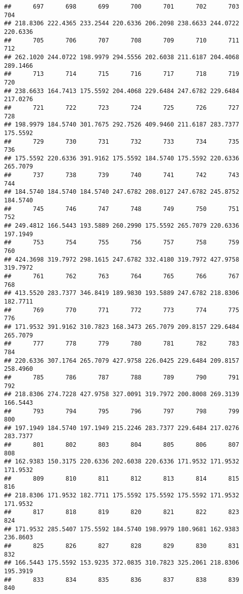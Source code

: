 \documentclass[
]{article}
\begin{document}
\begin{verbatim}
##      697      698      699      700      701      702      703      704 
## 218.8306 222.4365 233.2544 220.6336 206.2098 238.6633 244.0722 220.6336 
##      705      706      707      708      709      710      711      712 
## 262.1020 244.0722 198.9979 294.5556 202.6038 211.6187 204.4068 289.1466 
##      713      714      715      716      717      718      719      720 
## 238.6633 164.7413 175.5592 204.4068 229.6484 247.6782 229.6484 217.0276 
##      721      722      723      724      725      726      727      728 
## 198.9979 184.5740 301.7675 292.7526 409.9460 211.6187 283.7377 175.5592 
##      729      730      731      732      733      734      735      736 
## 175.5592 220.6336 391.9162 175.5592 184.5740 175.5592 220.6336 265.7079 
##      737      738      739      740      741      742      743      744 
## 184.5740 184.5740 184.5740 247.6782 208.0127 247.6782 245.8752 184.5740 
##      745      746      747      748      749      750      751      752 
## 249.4812 166.5443 193.5889 260.2990 175.5592 265.7079 220.6336 197.1949 
##      753      754      755      756      757      758      759      760 
## 424.3698 319.7972 298.1615 247.6782 332.4180 319.7972 427.9758 319.7972 
##      761      762      763      764      765      766      767      768 
## 413.5520 283.7377 346.8419 189.9830 193.5889 247.6782 218.8306 182.7711 
##      769      770      771      772      773      774      775      776 
## 171.9532 391.9162 310.7823 168.3473 265.7079 209.8157 229.6484 265.7079 
##      777      778      779      780      781      782      783      784 
## 220.6336 307.1764 265.7079 427.9758 226.0425 229.6484 209.8157 258.4960 
##      785      786      787      788      789      790      791      792 
## 218.8306 274.7228 427.9758 327.0091 319.7972 200.8008 269.3139 166.5443 
##      793      794      795      796      797      798      799      800 
## 197.1949 184.5740 197.1949 215.2246 283.7377 229.6484 217.0276 283.7377 
##      801      802      803      804      805      806      807      808 
## 162.9383 150.3175 220.6336 202.6038 220.6336 171.9532 171.9532 171.9532 
##      809      810      811      812      813      814      815      816 
## 218.8306 171.9532 182.7711 175.5592 175.5592 175.5592 171.9532 171.9532 
##      817      818      819      820      821      822      823      824 
## 171.9532 285.5407 175.5592 184.5740 198.9979 180.9681 162.9383 236.8603 
##      825      826      827      828      829      830      831      832 
## 166.5443 175.5592 153.9235 372.0835 310.7823 325.2061 218.8306 195.3919 
##      833      834      835      836      837      838      839      840 

\end{verbatim}
\end{document}
